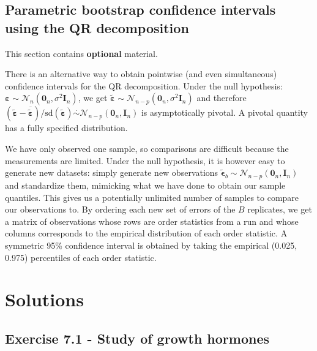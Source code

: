 \documentclass[]{book}
\theoremstyle{definition}
\theoremstyle{definition}
\theoremstyle{definition}
\theoremstyle{remark}
\begin{document}
\hypertarget{parametric-bootstrap-confidence-intervals-using-the-qr-decomposition}{%
\subsection{Parametric bootstrap confidence intervals using the QR decomposition}\label{parametric-bootstrap-confidence-intervals-using-the-qr-decomposition}}

This section contains \textbf{optional} material.

There is an alternative way to obtain pointwise (and even simultaneous) confidence intervals for the QR decomposition.
Under the null hypothesis: \(\boldsymbol{\varepsilon} \sim \mathcal{N}_{n}(\mathbf{0}_n, \sigma^2\mathbf{I}_n)\), we get \(\tilde{\boldsymbol{\varepsilon}} \sim \mathcal{N}_{n-p}(\mathbf{0}_n, \sigma^2\mathbf{I}_n)\) and therefore \((\tilde{\boldsymbol{\varepsilon}}- \overline{\boldsymbol{\tilde{\varepsilon}}})/\mathrm{sd}(\boldsymbol{\tilde{\varepsilon}}) \stackrel{\cdot}{\sim} \mathcal{N}_{n-p}(\mathbf{0}_n, \mathbf{I}_n)\) is asymptotically pivotal. A pivotal quantity has a fully specified distribution.

We have only observed one sample, so comparisons are difficult because the measurements are limited.
Under the null hypothesis, it is however easy to generate new datasets: simply generate new observations
\(\tilde{\boldsymbol{\epsilon}}_b \sim \mathcal{N}_{n-p}(\mathbf{0}_n, \mathbf{I}_n)\) and standardize them, mimicking what we have done to obtain our sample quantiles.
This gives us a potentially unlimited number of samples to compare our observations to.
By ordering each new set of errors of the \(B\) replicates, we get a matrix of observations whose rows are order statistics from a run and whose columns corresponds to the empirical distribution of each order statistic. A symmetric 95\% confidence interval is obtained by taking the empirical (0.025, 0.975) percentiles of each order statistic.

\hypertarget{solutions-3}{%
\section{Solutions}\label{solutions-3}}

\hypertarget{exercise-7.1---study-of-growth-hormones}{%
\subsection{Exercise 7.1 - Study of growth hormones}\label{exercise-7.1---study-of-growth-hormones}}
\end{document}
